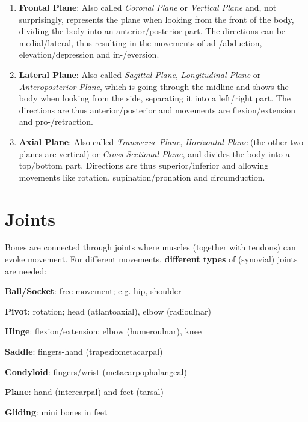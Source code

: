 \begin{enumerate}
    \item \textbf{Frontal Plane}: Also called \textit{Coronal Plane} or \textit{Vertical Plane} and, not surprisingly, represents the plane when looking from the front of the body, dividing the body into an anterior/posterior part.
    The directions can be medial/lateral, thus resulting in the movements of ad-/abduction, elevation/depression and in-/eversion.
    \item \textbf{Lateral Plane}: Also called \textit{Sagittal Plane}, \textit{Longitudinal Plane} or \textit{Anteroposterior Plane}, which is going through the midline and shows the body when looking from the side, separating it into a left/right part.
    The directions are thus anterior/posterior and movements are flexion/extension and pro-/retraction.
    \item \textbf{Axial Plane}: Also called \textit{Transverse Plane}, \textit{Horizontal Plane} (the other two planes are vertical) or \textit{Cross-Sectional Plane}, and divides the body into a top/bottom part.
    Directions are thus superior/inferior and allowing movements like rotation, supination/pronation and circumduction.
\end{enumerate}

\section{Joints}\label{sec:joints}

Bones are connected through joints where muscles (together with tendons) can evoke movement.
For different movements, \textbf{different types} of (synovial) joints are needed:

\begin{itemize*}
    \item \textbf{Ball/Socket}: free movement; e.g. hip, shoulder
    \item \textbf{Pivot}: rotation; head (atlantoaxial), elbow (radioulnar)
    \item \textbf{Hinge}: flexion/extension; elbow (humeroulnar), knee
    \item \textbf{Saddle}: fingers-hand (trapeziometacarpal)
    \item \textbf{Condyloid}: fingers/wrist (metacarpophalangeal)
    \item \textbf{Plane}: hand (intercarpal) and feet (tarsal)
    \item \textbf{Gliding}: mini bones in feet
\end{itemize*}
